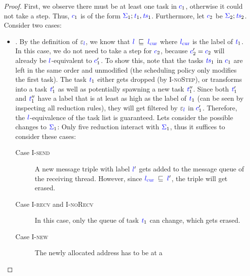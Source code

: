 \documentclass{llncs}
\newcommand{\Varid}[1]{\mathit{#1}}
\begin{document}
\begin{proof}
  First, we observe there must be at least one task in \ensuremath{\ifc{c}_{1}}, otherwise
  it could not take a step.  Thus, \ensuremath{\ifc{c}_{1}} is of the form
  \ensuremath{\ifc{\Sigma}_{1};\ifc{\Varid{t}}_{1},\ifc{\Varid{ts}}_{1}}.
  Furthermore, let \ensuremath{\ifc{c}_{2}} be \ensuremath{\ifc{\Sigma}_{2};\ifc{\Varid{ts}}_{2}}.
  Consider two cases:
  \begin{itemize}
    \item .
    By the definition of \ensuremath{\varepsilon_{\ifc{l}}}, we know that \ensuremath{\ifc{l}\;\flows{}\;\lcurr}
    where \ensuremath{\lcurr} is the label of \ensuremath{\ifc{\Varid{t}}_{1}}.
    In this case, we do not need to take a step for
    \ensuremath{\ifc{c}_{2}}, because \ensuremath{\ifc{c}_{2}'\mathrel{=}\ifc{c}_{2}} will already be \ensuremath{\ifc{l}}-equivalent to \ensuremath{\ifc{c}_{1}'}.
    To show this, note that the tasks \ensuremath{\ifc{\Varid{ts}}_{1}} in \ensuremath{\ifc{c}_{1}} are left in the
    same order and unmodified (the scheduling policy only
    modifies the first task). The task \ensuremath{\ifc{\Varid{t}}_{1}} either
    gets dropped (by \textsc{I-noStep}), or
    transforms into a task \ensuremath{\ifc{\Varid{t}}_{1}'} as well as potentially spawning a new
    task \ensuremath{\ifc{\Varid{t}}_{1}''}.  Since both \ensuremath{\ifc{\Varid{t}}_{1}'} and \ensuremath{\ifc{\Varid{t}}_{1}''} have a label that is
    at least as high as the label of \ensuremath{\ifc{\Varid{t}}_{1}} (can be seen
    by inspecting all reduction rules), they will get filtered
    by \ensuremath{\varepsilon_{\ifc{l}}} in \ensuremath{\ifc{c}_{1}'}.  Therefore, the \ensuremath{\ifc{l}}-equivalence of the
    task list is guaranteed.
    Lets consider the possible changes to \ensuremath{\ifc{\Sigma}_{1}}:
    Only five reduction interact with \ensuremath{\ifc{\Sigma}_{1}},
    thus it suffices to consider these cases:
    \begin{description}
      \item[Case \textsc{I-send}]
      A new message triple with label \ensuremath{\ifc{l}'} gets added to the message
      queue of the receiving thread.  However, since \ensuremath{\lcurr\;\flows{}\;\ifc{l}'},
      the triple will get erased.
      \item[Case \textsc{I-recv} and \textsc{I-noRecv}]
      In this case, only the queue of
      task \ensuremath{\ifc{\Varid{t}}_{1}} can change, which gets erased.
      \item[Case \textsc{I-new}] The newly allocated address has to be at a

\end{description}
\end{itemize}
\end{proof}
\end{document}

